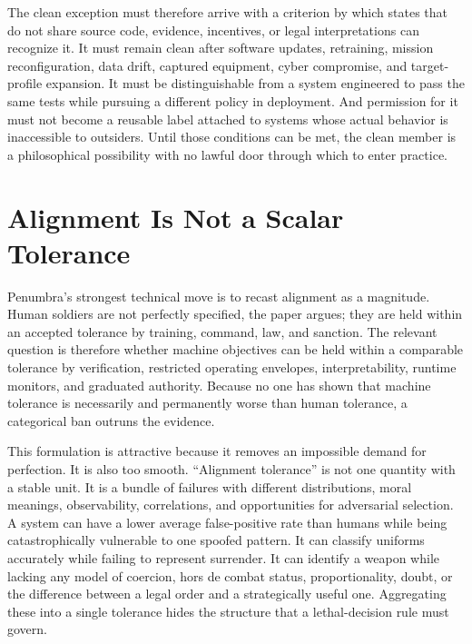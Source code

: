 \documentclass[11pt]{article}
\begin{document}
The clean exception must therefore arrive with a criterion by which states that do not share source code, evidence, incentives, or legal interpretations can recognize it. It must remain clean after software updates, retraining, mission reconfiguration, data drift, captured equipment, cyber compromise, and target-profile expansion. It must be distinguishable from a system engineered to pass the same tests while pursuing a different policy in deployment. And permission for it must not become a reusable label attached to systems whose actual behavior is inaccessible to outsiders. Until those conditions can be met, the clean member is a philosophical possibility with no lawful door through which to enter practice.

\section{Alignment Is Not a Scalar Tolerance}
\label{sec:alignment}

Penumbra's strongest technical move is to recast alignment as a magnitude. Human soldiers are not perfectly specified, the paper argues; they are held within an accepted tolerance by training, command, law, and sanction. The relevant question is therefore whether machine objectives can be held within a comparable tolerance by verification, restricted operating envelopes, interpretability, runtime monitors, and graduated authority. Because no one has shown that machine tolerance is necessarily and permanently worse than human tolerance, a categorical ban outruns the evidence.

This formulation is attractive because it removes an impossible demand for perfection. It is also too smooth. ``Alignment tolerance'' is not one quantity with a stable unit. It is a bundle of failures with different distributions, moral meanings, observability, correlations, and opportunities for adversarial selection. A system can have a lower average false-positive rate than humans while being catastrophically vulnerable to one spoofed pattern. It can classify uniforms accurately while failing to represent surrender. It can identify a weapon while lacking any model of coercion, hors de combat status, proportionality, doubt, or the difference between a legal order and a strategically useful one. Aggregating these into a single tolerance hides the structure that a lethal-decision rule must govern.
\end{document}
